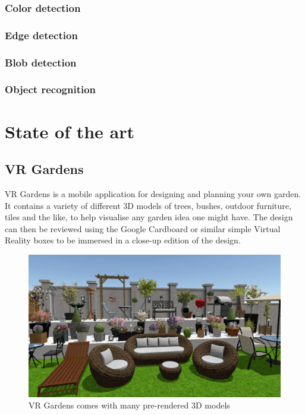 			\subsubsection{Color detection}
			
			\subsubsection{Edge detection}
			
			\subsubsection{Blob detection}
			
			\subsubsection{Object recognition}

    \section{State of the art}\label{sec:SOTA}
		
		\subsection{VR Gardens}
			VR Gardens is a mobile application for designing and planning your own garden. It contains a variety of different 3D models of trees, bushes, outdoor furniture, tiles and the like, to help visualise any garden idea one might have. The design can then be reviewed using the Google Cardboard or similar simple Virtual Reality boxes to be immersed in a close-up edition of the design.
			\begin{figure}[H]
				\centering
				\includegraphics[width=0.6\linewidth]{figure/Analysis/vrgardens}
				\caption{VR Gardens comes with many pre-rendered 3D models}
				\label{fig:vrgardens}
			\end{figure}
			
